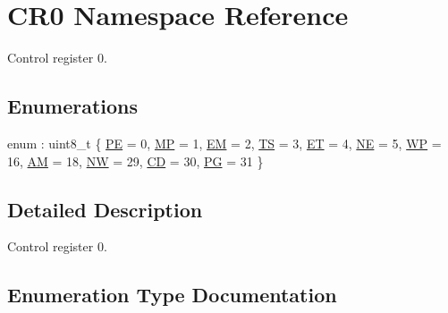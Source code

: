 \hypertarget{namespace_c_r0}{}\section{C\+R0 Namespace Reference}
\label{namespace_c_r0}


Control register 0.  


\subsection*{Enumerations}
\begin{DoxyCompactItemize}
\item 
enum \+: uint8\+\_\+t \{ \newline
\hyperlink{namespace_c_r0_a9b4684de9b26ecfcede75561aae698c6a7f3a9f7cae8ff9783116b3807a9e7f63}{PE} = 0, 
\hyperlink{namespace_c_r0_a9b4684de9b26ecfcede75561aae698c6a5d476977d06d7c0b03c9c15c07a79a67}{MP} = 1, 
\hyperlink{namespace_c_r0_a9b4684de9b26ecfcede75561aae698c6a7b84c2b5b161093766d5ce338ae954fd}{EM} = 2, 
\hyperlink{namespace_c_r0_a9b4684de9b26ecfcede75561aae698c6a11d3ddf6dc3d1d972c1df841c8612a98}{TS} = 3, 
\newline
\hyperlink{namespace_c_r0_a9b4684de9b26ecfcede75561aae698c6aea1442f406aa6dac094cac2466be6da7}{ET} = 4, 
\hyperlink{namespace_c_r0_a9b4684de9b26ecfcede75561aae698c6aec96b199175e3576b8864dc1ac07ac4e}{NE} = 5, 
\hyperlink{namespace_c_r0_a9b4684de9b26ecfcede75561aae698c6a26b870d7f1a47ad83f6c2ce739189171}{WP} = 16, 
\hyperlink{namespace_c_r0_a9b4684de9b26ecfcede75561aae698c6a2325d7d071248d4efffdf7bd809decb7}{AM} = 18, 
\newline
\hyperlink{namespace_c_r0_a9b4684de9b26ecfcede75561aae698c6a09776e60fc989f19ae0f04a402d2d1bb}{NW} = 29, 
\hyperlink{namespace_c_r0_a9b4684de9b26ecfcede75561aae698c6a4154f3b5cb906ec0bfab20c87e8a7d84}{CD} = 30, 
\hyperlink{namespace_c_r0_a9b4684de9b26ecfcede75561aae698c6a674029f08e40b913896b27f5cb5e1ec8}{PG} = 31
 \}
\end{DoxyCompactItemize}


\subsection{Detailed Description}
Control register 0. 

\subsection{Enumeration Type Documentation}
\mbox{\label{namespace_c_r0_a9b4684de9b26ecfcede75561aae698c6}} 
